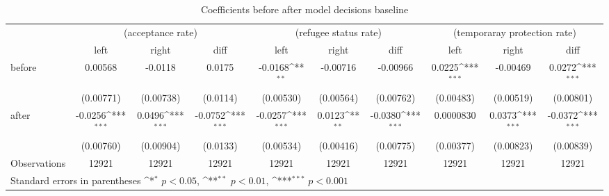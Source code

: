 \begin{table}[!ht]\centering \scriptsize
\def\sym#1{\ifmmode^{#1}\else\(^{#1}\)\fi}
\caption{Coefficients before after model decisions baseline}
\begin{tabular}{l*{9}{c}}
\hline\hline
                    &\multicolumn{3}{c}{(acceptance rate)}&\multicolumn{3}{c}{(refugee status rate)}&\multicolumn{3}{c}{(temporaray protection rate)}\\
                    &\multicolumn{1}{c}{left}&\multicolumn{1}{c}{right}&\multicolumn{1}{c}{diff}&\multicolumn{1}{c}{left}&\multicolumn{1}{c}{right}&\multicolumn{1}{c}{diff}&\multicolumn{1}{c}{left}&\multicolumn{1}{c}{right}&\multicolumn{1}{c}{diff}\\
\hline
before              &     0.00568         &     -0.0118         &      0.0175         &     -0.0168\sym{**} &    -0.00716         &    -0.00966         &      0.0225\sym{***}&    -0.00469         &      0.0272\sym{***}\\
                    &   (0.00771)         &   (0.00738)         &    (0.0114)         &   (0.00530)         &   (0.00564)         &   (0.00762)         &   (0.00483)         &   (0.00519)         &   (0.00801)         \\
[0.5em]
after               &     -0.0256\sym{***}&      0.0496\sym{***}&     -0.0752\sym{***}&     -0.0257\sym{***}&      0.0123\sym{**} &     -0.0380\sym{***}&   0.0000830         &      0.0373\sym{***}&     -0.0372\sym{***}\\
                    &   (0.00760)         &   (0.00904)         &    (0.0133)         &   (0.00534)         &   (0.00416)         &   (0.00775)         &   (0.00377)         &   (0.00823)         &   (0.00839)         \\
\hline
Observations        &       12921         &       12921         &       12921         &       12921         &       12921         &       12921         &       12921         &       12921         &       12921         \\
\hline\hline
\multicolumn{10}{l}{\footnotesize Standard errors in parentheses \sym{*} \(p<0.05\), \sym{**} \(p<0.01\), \sym{***} \(p<0.001\)}\\
\end{tabular}
\end{table}
